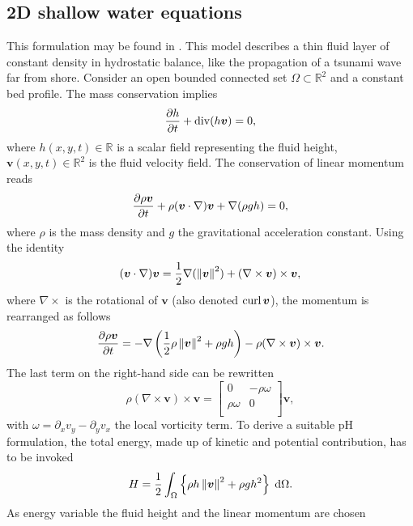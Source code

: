 \subsection{2D shallow water equations}\label{sec:shallowwater}
This formulation may be found in \cite[Section 6.2]{cardoso2016}. This model describes a thin fluid layer of constant density in hydrostatic balance, like the propagation of a tsunami wave far from shore. Consider an open bounded connected set $\Omega \subset \mathbb{R}^2$ and a constant bed profile. The mass conservation implies
\begin{equation*}
\diffp{h}{t} + \div(h\bm{v}) = 0,
\end{equation*}
where $h(x,y,t) \in \mathbb{R}$ is a scalar field representing the fluid height, $\bm{v}(x,y,t) \in \mathbb{R}^2$ is the fluid velocity field. The conservation of linear momentum reads
\begin{equation*}
\diffp{\rho\bm{v}}{t} + \rho (\bm{v} \cdot \nabla) \bm{v} + \nabla(\rho g h) = 0,
\end{equation*}
where $\rho$ is the mass density and $g$ the gravitational acceleration constant. Using the identity
\begin{equation*}
(\bm{v} \cdot \nabla) \bm{v} = \frac{1}{2} \nabla(\left\|\bm{v}\right\|^2)  + (\nabla \times \bm{v}) \times \bm{v}, 
\end{equation*}
where $\nabla \times$ is the rotational of $\bm{v}$ (also denoted $\operatorname*{curl} \bm{v}$), the momentum is rearranged as follows
\begin{equation*}
\diffp{\rho \bm{v}}{t} = -\nabla\left(\frac{1}{2}\rho \norm{\bm{v}}^2 + \rho g h\right) - \rho (\nabla \times \bm{v}) \times \bm{v}.
\end{equation*}
The last term on the right-hand side can be rewritten
\begin{equation*}
\rho (\nabla \times \bm{v}) \times \bm{v} =   
\begin{bmatrix}
0 & -\rho\omega \\
\rho\omega & 0 \\
\end{bmatrix}
\bm{v},
\end{equation*}
with $\omega = \partial_x v_y - \partial_y v_x$ the local vorticity term. To derive a suitable pH formulation, the total energy, made up of kinetic and potential contribution, has to be invoked
\begin{equation*}
H = \energy{\rho h \norm{\bm{v}}^2 + \rho g h^2}.
\end{equation*}
As energy variable the fluid height and the linear momentum are chosen
